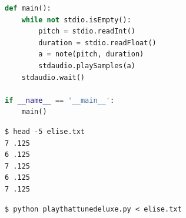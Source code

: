 \documentclass[8pt,a4paper,compress]{beamer}
\begin{document}
\begin{frame}[fragile]
\pause

\begin{lstlisting}[language=Python]
def main():
    while not stdio.isEmpty():
        pitch = stdio.readInt()
        duration = stdio.readFloat()
        a = note(pitch, duration)
        stdaudio.playSamples(a)
    stdaudio.wait()

if __name__ == '__main__':
    main()
\end{lstlisting}

\pause

\begin{minipage}{170pt}
\begin{lstlisting}[language={}]
$ head -5 elise.txt
7 .125 
6 .125 
7 .125 
6 .125 
7 .125 
\end{lstlisting}

\pause

\begin{lstlisting}[language={}]
$ python playthattunedeluxe.py < elise.txt
\end{lstlisting}
\end{minipage}%
\begin{minipage}{130pt}
\hfill {}
\end{minipage}
\end{frame}
\end{document}
